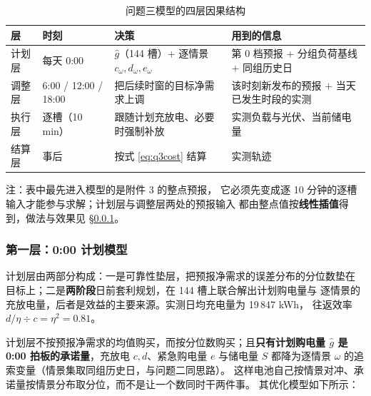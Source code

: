 \documentclass[withoutpreface]{cumcmthesis}
\renewcommand{\emph}[1]{\textbf{#1}}
\newcommand{\hd}[1]{\textbf{#1}}
\begin{document}
\begin{table}[!htbp]
  \centering
  \caption{问题三模型的四层因果结构}\label{tab:q3layer}
  \begin{tabular}{@{}l l l l@{}}
    \toprule[1.5pt]
    \hd{层} & \hd{时刻} & \hd{决策} & \hd{用到的信息}\\
    \midrule[1pt]
    计划层 & 每天 0:00 & $\hat g$（144 槽）$+$ 逐情景 $c_\omega,d_\omega,e_\omega$
      & 第 0 档预报 $+$ 分组负荷基线 $+$ 同组历史日\\
    调整层 & 6:00 / 12:00 / 18:00 & 把后续时窗的目标净需求上调
      & 该时刻新发布的预报 $+$ 当天已发生时段的实测\\
    执行层 & 逐槽（10 min） & 跟随计划充放电、必要时强制补放
      & 实测负载与光伏、当前储电量\\
    结算层 & 事后 & 按式 \eqref{eq:q3cost} 结算 & 实测轨迹\\
    \bottomrule[1.5pt]
  \end{tabular}

  \vspace{2pt}
  \parbox{0.95\textwidth}{ 注：表中最先进入模型的是附件 3 的整点预报，
  它必须先变成逐 10 分钟的逐槽输入才能参与求解；计划层与调整层两处的预报输入
  都由整点值按\emph{线性插值}得到，做法与效果见 \S\ref{sec:q3plan}。}
\end{table}

\subsubsection{第一层：0:00 计划模型}
\label{sec:q3plan}

计划层由两部分构成：一是可靠性垫层，把预报净需求的误差分布的分位数垫在
目标上；二是\emph{两阶段}日前套利规划，在 144 槽上联合解出计划购电量与
逐情景的充放电量，后者是效益的主要来源。实测日均充电量为 19\,847 kWh，
往返效率 $d/\eta\div c=\eta^2=0.81$。

计划层不按预报净需求的均值购买，而按分位数购买；且\textbf{只有计划购电量
$\hat g$ 是 0:00 拍板的承诺量}，充放电 $c,d$、紧急购电量 $e$ 与储电量 $S$
都降为逐情景 $\omega$ 的追索变量（情景集取同组历史日，与问题二同思路）。
这样电池自己按情景对冲、承诺量按情景分布取分位，而不是让一个数同时干两件事。
其优化模型如下所示：
\end{document}

